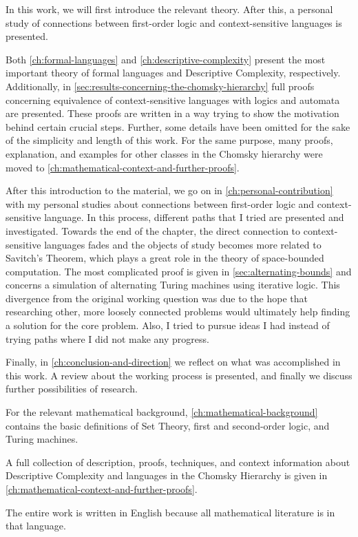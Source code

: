 In this work, we will first introduce the relevant theory.
After this, a personal study of connections between first-order logic and context-sensitive languages is presented.

Both \cref{ch:formal-languages} and \cref{ch:descriptive-complexity} present the most important theory of formal languages and Descriptive Complexity, respectively.
Additionally, in \cref{sec:results-concerning-the-chomsky-hierarchy} full proofs concerning equivalence of context-sensitive languages with logics and automata are presented.
These proofs are written in a way trying to show the motivation behind certain crucial steps.
Further, some details have been omitted for the sake of the simplicity and length of this work.
For the same purpose, many proofs, explanation, and examples for other classes in the Chomsky hierarchy were moved to \cref{ch:mathematical-context-and-further-proofs}.

After this introduction to the material, we go on in \cref{ch:personal-contribution} with my personal studies about connections between first-order logic and context-sensitive language.
In this process, different paths that I tried are presented and investigated.
Towards the end of the chapter, the direct connection to context-sensitive languages fades and the objects of study becomes more related to Savitch's Theorem, which plays a great role in the theory of space-bounded computation.
The most complicated proof is given in \cref{sec:alternating-bounds} and concerns a simulation of alternating Turing machines using iterative logic.
This divergence from the original working question was due to the hope that researching other, more loosely connected problems would ultimately help finding a solution for the core problem.
Also, I tried to pursue ideas I had instead of trying paths where I did not make any progress.

Finally, in \cref{ch:conclusion-and-direction} we reflect on what was accomplished in this work.
A review about the working process is presented, and finally we discuss further possibilities of research.

For the relevant mathematical background, \cref{ch:mathematical-background} contains the basic definitions of Set Theory, first and second-order logic, and Turing machines.

A full collection of description, proofs, techniques, and context information about Descriptive Complexity and languages in the Chomsky Hierarchy is given in \cref{ch:mathematical-context-and-further-proofs}.

The entire work is written in English because all mathematical literature is in that language.